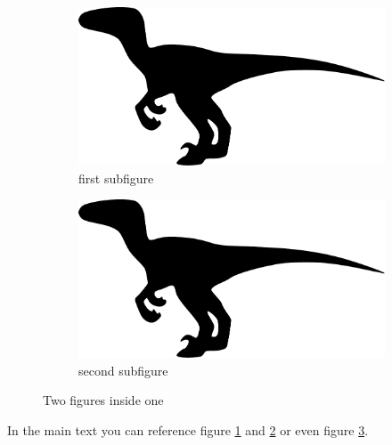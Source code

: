 \documentclass{scrartcl}
\begin{document}
\begin{figure}
	\centering
  	\begin{subfigure}{.45\textwidth}
		\centering
		\includegraphics[width=.5\textwidth]{raptor}
		\caption{first subfigure}\label{fig:raptor1}
	\end{subfigure}
	\begin{subfigure}{.45\textwidth}
		\centering
	    \includegraphics[width=.5\textwidth]{raptor}
	    \caption{second subfigure}\label{fig:raptor2}
    \end{subfigure}
    \caption{Two figures inside one}\label{fig:raptors}
\end{figure}

In the main text you can reference figure \ref{fig:raptor1} and \ref{fig:raptor2} or even figure \ref{fig:raptors}.
\end{document}
